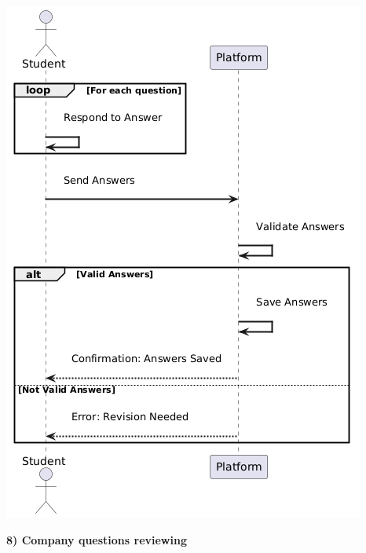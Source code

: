 \begin{center}
    \includegraphics[scale = 0.8]{Images/ImagesRASD/Student_sending_answers.png}
\end{center}

\newpage
\textbf{8) Company questions reviewing}\\

